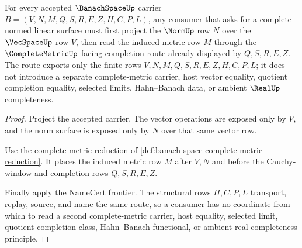 \begin{theorem}
\label{thm:banach-space-normed-linear-complete-metric-route}
For every accepted $\BanachSpaceUp$ carrier $B=(V,N,M,Q,S,R,E,Z,H,C,P,L)$, any consumer that asks for a complete normed linear surface must first project the $\NormUp$ row $N$ over the $\VecSpaceUp$ row $V$, then read the induced metric row $M$ through the $\CompleteMetricUp$-facing completion route already displayed by $Q,S,R,E,Z$. The route exports only the finite rows $V,N,M,Q,S,R,E,Z,H,C,P,L$; it does not introduce a separate complete-metric carrier, host vector equality, quotient completion equality, selected limits, Hahn--Banach data, or ambient $\RealUp$ completeness.
\end{theorem}
\begin{proof}
Project the accepted carrier. The vector operations are exposed only by $V$, and the norm surface is exposed only by $N$ over that same vector row.

Use the complete-metric reduction of \autoref{def:banach-space-complete-metric-reduction}. It places the induced metric row $M$ after $V,N$ and before the Cauchy-window and completion rows $Q,S,R,E,Z$.

Finally apply the NameCert frontier. The structural rows $H,C,P,L$ transport, replay, source, and name the same route, so a consumer has no coordinate from which to read a second complete-metric carrier, host equality, selected limit, quotient completion class, Hahn--Banach functional, or ambient real-completeness principle.
\end{proof}

